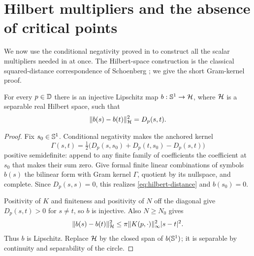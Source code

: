 \section{Hilbert multipliers and the absence of critical points}\label{sec:conclusion}

We now use the conditional negativity proved in  to construct all the scalar multipliers needed in  at once. The Hilbert-space construction is the classical squared-distance correspondence of Schoenberg \cite{Schoenberg1938}; we give the short Gram-kernel proof.

\begin{lemma}\label{lem:hilbert}
For every $p\in\mathbb D$ there is an injective Lipschitz map $b:\mathbb S^1\to\mathcal H$, where $\mathcal H$ is a separable real Hilbert space, such that
\begin{equation}\label{eq:hilbert-distance}
\lVert b(s)-b(t)\rVert_\mathcal H^2=D_p(s,t).
\end{equation}
\end{lemma}
\begin{proof}
Fix $s_0\in\mathbb S^1$. Conditional negativity makes the anchored kernel
\[
\Gamma(s,t)=\tfrac12\bigl(D_p(s,s_0)+D_p(t,s_0)-D_p(s,t)\bigr)
\]
positive semidefinite: append to any finite family of coefficients the coefficient at $s_0$ that makes their sum zero. Give formal finite linear combinations of symbols $b(s)$ the bilinear form with Gram kernel $\Gamma$, quotient by its nullspace, and complete. Since $D_p(s,s)=0$, this realizes \eqref{eq:hilbert-distance} and $b(s_0)=0$.

Positivity of $K$ and finiteness and positivity of $N$ off the diagonal give $D_p(s,t)>0$ for $s\ne t$, so $b$ is injective. Also $N\ge N_0$ gives
\[
\lVert b(s)-b(t)\rVert_\mathcal H^2
\le\pi\lVert K(p,\cdot)\rVert_\infty^2|s-t|^2.
\]
Thus $b$ is Lipschitz. Replace $\mathcal H$ by the closed span of $b(\mathbb S^1)$; it is separable by continuity and separability of the circle.
\end{proof}

